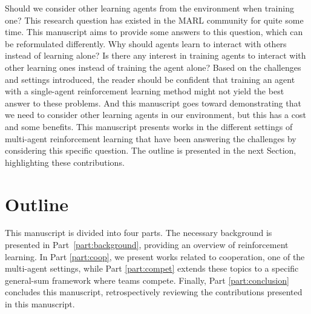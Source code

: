 Should we consider other learning agents from the environment when training one?
This research question has existed in the MARL community for quite some time.
This manuscript aims to provide some answers to this question, which can be reformulated differently.
Why should agents learn to interact with others instead of learning alone?
Is there any interest in training agents to interact with other learning ones instead of training the agent alone?
Based on the challenges and settings introduced, the reader should be confident that training an agent with a single-agent reinforcement learning method might not yield the best answer to these problems.
And this manuscript goes toward demonstrating that we need to consider other learning agents in our environment, but this has a cost and some benefits.
This manuscript presents works in the different settings of multi-agent reinforcement learning that have been answering the challenges by considering this specific question.
The outline is presented in the next Section, highlighting these contributions.


\section{Outline}
\label{sec:ch1_outline}
This manuscript is divided into four parts.
The necessary background is presented in Part~\ref{part:background}, providing an overview of reinforcement learning.
In Part \ref{part:coop}, we present works related to cooperation, one of the multi-agent settings, while Part \ref{part:compet} extends these topics to a specific general-sum framework where teams compete.
Finally, Part \ref{part:conclusion} concludes this manuscript, retrospectively reviewing the contributions presented in this manuscript.

